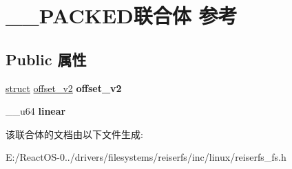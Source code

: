 \hypertarget{union_____p_a_c_k_e_d}{}\section{\+\_\+\+\_\+\+P\+A\+C\+K\+E\+D联合体 参考}
\label{union_____p_a_c_k_e_d}
\subsection*{Public 属性}
\begin{DoxyCompactItemize}
\item 
\mbox{\label{union_____p_a_c_k_e_d_a433132e491ec0d67c8e1a446edb800a7}} 
\hyperlink{interfacestruct}{struct} \hyperlink{structoffset__v2}{offset\+\_\+v2} {\bfseries offset\+\_\+v2}
\item 
\mbox{\label{union_____p_a_c_k_e_d_ac3952746199d105ee88ac2a39834c0b6}} 
\+\_\+\+\_\+u64 {\bfseries linear}
\end{DoxyCompactItemize}


该联合体的文档由以下文件生成\+:\begin{DoxyCompactItemize}
\item 
E\+:/\+React\+O\+S-\/0../drivers/filesystems/reiserfs/inc/linux/reiserfs\+\_\+fs.\+h\end{DoxyCompactItemize}
